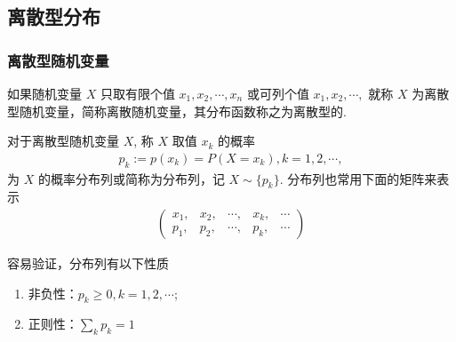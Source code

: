 \subsection{离散型分布}
\begin{frame}
	\frametitle{离散型随机变量}
	\begin{defi}[离散型随机变量] 如果随机变量 $X$ 只取有限个值 $x_1,x_2,\cdots, x_n$ 或可列个值 $x_1,x_2,\cdots,$ 就称 $X$ 为离散型随机变量，简称离散随机变量，其分布函数称之为离散型的.
	\end{defi}
	\pause
	\begin{defi}[离散型随机变量的分布列或概率质量函数] 对于离散型随机变量 $X$, 称 $X$ 取值 $x_k$ 的概率
		\begin{eqnarray*}
			p_k:=p(x_k)=P(X=x_k), k=1,2,\cdots,
		\end{eqnarray*}
		为 $X$ 的概率分布列或简称为分布列，记 $X\sim \{p_k\}$. 分布列也常用下面的矩阵来表示
		\begin{eqnarray*}
			\left(\begin{array}{ccccc}
				x_1, & x_2, & \cdots, & x_k, & \cdots  \\
				p_1, & p_2, & \cdots, & p_k, & \cdots
			\end{array}\right)
		\end{eqnarray*}
	\end{defi}
	\pause
	容易验证，分布列有以下性质
	\begin{enumerate}[<+-|alert@+>]
		\item 非负性：$p_k\ge 0, k=1,2,\cdots$;
		\item 正则性：$\sum_{k} p_k=1$
	\end{enumerate}


\end{frame}

